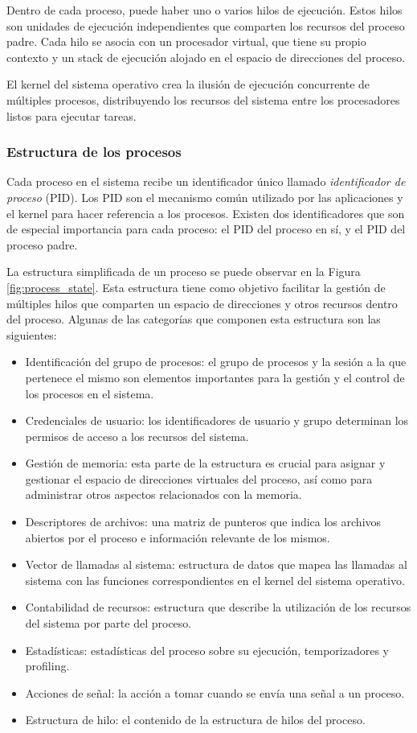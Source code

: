 Dentro de cada proceso, puede haber uno o varios hilos de ejecución. Estos hilos son unidades de ejecución independientes que comparten los recursos del proceso padre. Cada hilo se asocia con un procesador virtual, que tiene su propio contexto y un stack de ejecución alojado en el espacio de direcciones del proceso.\par

El kernel del sistema operativo crea la ilusión de ejecución concurrente de múltiples procesos, distribuyendo los recursos del sistema entre los procesadores listos para ejecutar tareas.\par

\subsubsection{Estructura de los procesos}
Cada proceso en el sistema recibe un identificador único llamado \textit{identificador de proceso} (PID). Los PID son el mecanismo común utilizado por las aplicaciones y el kernel para hacer referencia a los procesos. Existen dos identificadores que son de especial importancia para cada proceso: el PID del proceso en sí, y el PID del proceso padre.

La estructura simplificada de un proceso se puede observar en la Figura \ref{fig:process_state}. Esta estructura tiene como objetivo facilitar la gestión de múltiples hilos que comparten un espacio de direcciones y otros recursos dentro del proceso. Algunas de las categorías que componen esta estructura son las siguientes:

\begin{itemize}
    \item Identificación del grupo de procesos: el grupo de procesos y la sesión a la que pertenece el mismo son elementos importantes para la gestión y el control de los procesos en el sistema.
    \item Credenciales de usuario: los identificadores de usuario y grupo determinan los permisos de acceso a los recursos del sistema.
    \item Gestión de memoria: esta parte de la estructura es crucial para asignar y gestionar el espacio de direcciones virtuales del proceso, así como para administrar otros aspectos relacionados con la memoria.
    \item Descriptores de archivos: una matriz de punteros que indica los archivos abiertos por el proceso e información relevante de los mismos.
    \item Vector de llamadas al sistema: estructura de datos que mapea las llamadas al sistema con las funciones correspondientes en el kernel del sistema operativo.
    \item Contabilidad de recursos: estructura que describe la utilización de los recursos del sistema por parte del proceso.
    \item Estadísticas: estadísticas del proceso sobre su ejecución, temporizadores y profiling.
    \item Acciones de señal: la acción a tomar cuando se envía una señal a un proceso.
    \item Estructura de hilo: el contenido de la estructura de hilos del proceso.
\end{itemize}

